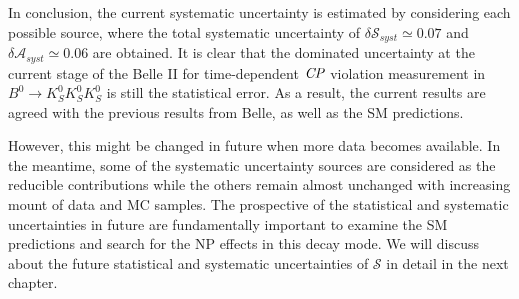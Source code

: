 In conclusion, the current systematic uncertainty is estimated by considering each possible source, where the total systematic uncertainty of $\delta \mathcal{S}_{syst} \simeq 0.07$ and $\delta \mathcal{A}_{syst} \simeq 0.06$ are obtained. It is clear that the dominated uncertainty at the current stage of the Belle II for time-dependent $\it{CP}$ violation measurement in $B^0 \to K_S^0  K_S^0  K_S^0$ is still the statistical error. As a result, the 
current results are agreed with the previous results from Belle, as well as the SM predictions.

However, this might be changed in future when more data becomes available. In the meantime, some of the systematic uncertainty sources are considered as the reducible contributions while the others remain almost unchanged with increasing mount of data and MC samples. The prospective of the statistical and systematic uncertainties in future are fundamentally important to examine the SM predictions and search for the NP effects in this decay mode. We will discuss about the future statistical and systematic uncertainties of $\mathcal{S}$ in detail in the next chapter.


